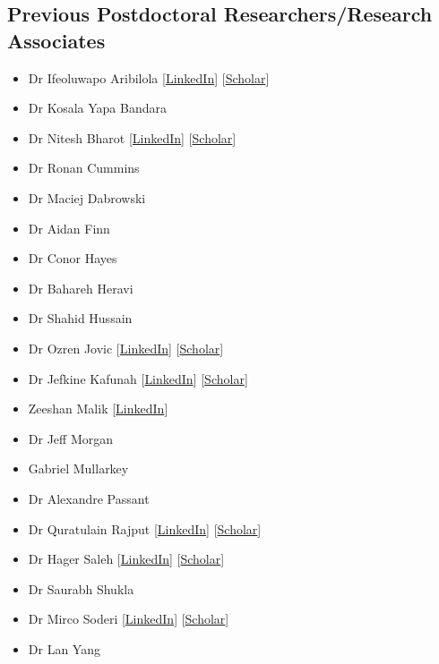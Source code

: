 \documentclass[10pt,a4paper]{res} %
\begin{document}
\begin{resume}
\subsection*{Previous Postdoctoral Researchers/Research Associates}

\begin{itemize} \itemsep -2pt
\item Dr Ifeoluwapo Aribilola
[\href{https://www.linkedin.com/in/ifeoluwapo-aribilola-205a63a1/}{LinkedIn}]
[\href{https://scholar.google.com/citations?user=koH5UckAAAAJ&hl=en}{Scholar}]
\item Dr Kosala Yapa Bandara
\item Dr Nitesh Bharot
[\href{https://www.linkedin.com/in/nitesh-bharot-72bb2049/}{LinkedIn}]
[\href{https://scholar.google.com/citations?hl=en&user=jmX6gMMAAAAJ}{Scholar}]
\item Dr Ronan Cummins
\item Dr Maciej Dabrowski
\item Dr Aidan Finn
\item Dr Conor Hayes
\item Dr Bahareh Heravi
\item Dr Shahid Hussain
\item Dr Ozren Jovic
[\href{https://www.linkedin.com/in/ozren-jovi%C4%87-a8a775135/}{LinkedIn}]
[\href{https://scholar.google.com/citations?hl=en&user=7WQX2AMAAAAJ}{Scholar}]
\item Dr Jefkine Kafunah
[\href{https://www.linkedin.com/in/jefkine/}{LinkedIn}]
[\href{https://scholar.google.com/citations?hl=en&user=ftmf0kAAAAAJ}{Scholar}]
\item Zeeshan Malik
[\href{https://www.linkedin.com/in/zeeshan-malik-85517a20/}{LinkedIn}]
\item Dr Jeff Morgan
\item Gabriel Mullarkey
\item Dr Alexandre Passant
\item Dr Quratulain Rajput
[\href{https://www.linkedin.com/in/ms-quratulain-rajput-535a4112/}{LinkedIn}]
[\href{https://scholar.google.com/citations?hl=en&user=vSbsI1IAAAAJ}{Scholar}]
\item Dr Hager Saleh
[\href{https://www.linkedin.com/in/hager-saleh-4a373175/}{LinkedIn}]
[\href{https://scholar.google.com/citations?hl=en&user=_zj4eUUAAAAJ}{Scholar}]
\item Dr Saurabh Shukla
\item Dr Mirco Soderi
[\href{https://www.linkedin.com/in/mirco-soderi-3b470525/}{LinkedIn}]
[\href{https://scholar.google.com/citations?hl=en&user=rVXaN2QAAAAJ}{Scholar}]
\item Dr Lan Yang
\end{itemize}


\end{resume}
\end{document}
